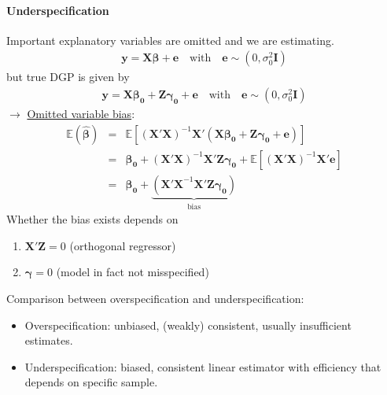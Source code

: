 \paragraph{Underspecification} Important explanatory variables are omitted and we are estimating.
\begin{eqnarray*}
\boldsymbol{y}=\boldsymbol{X\beta}+\boldsymbol{e}\quad \text{with}\quad\boldsymbol{e}\sim(0,\sigma_{0}^{2}\boldsymbol{I})
\end{eqnarray*}
but true DGP is given by
\begin{eqnarray*}
\boldsymbol{y}=\boldsymbol{X\beta_{0}}+\boldsymbol{Z\gamma_{0}}+\boldsymbol{e}\quad \text{with}\quad\boldsymbol{e}\sim(0,\sigma_{0}^{2}\boldsymbol{I})
\end{eqnarray*}
$\to$ \underline{Omitted variable bias}:
\begin{eqnarray*}
\mathbb{E}(\boldsymbol{\hat{\beta}}) &=& \mathbb{E}[(\boldsymbol{X'X})^{-1}\boldsymbol{X'}(\boldsymbol{X\beta_{0}}+\boldsymbol{Z\gamma_{0}}+\boldsymbol{e})]\\
&=& \boldsymbol{\beta_{0}}+(\boldsymbol{X'X})^{-1}\boldsymbol{X'Z\gamma_{0}}+\mathbb{E}[(\boldsymbol{X'X})^{-1}\boldsymbol{X'e}]\\
&=& \boldsymbol{\beta_{0}}+\underbrace{(\boldsymbol{X'X}^{-1}\boldsymbol{X'Z\gamma_{0}})}_{\text{bias}}
\end{eqnarray*}
Whether the bias exists depends on
\begin{enumerate}[(1)]
\item $\boldsymbol{X'Z}=0$ (orthogonal regressor)
\item $\boldsymbol{\gamma}=0$ (model in fact not misspecified)
\end{enumerate}
Comparison between overspecification and underspecification:
\begin{itemize}
\item Overspecification: unbiased, (weakly) consistent, usually insufficient estimates.
\item Underspecification: biased, consistent linear estimator with efficiency that depends on specific sample.
\end{itemize}

